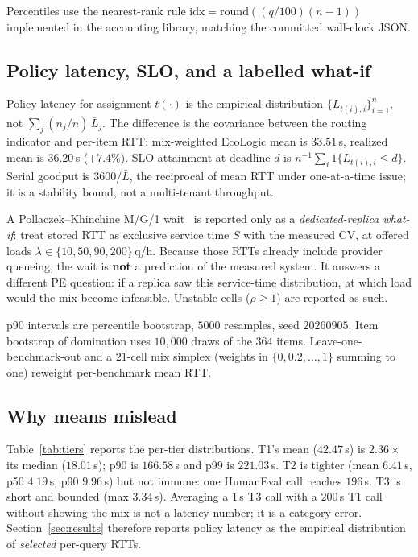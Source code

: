 \documentclass[10pt,conference]{IEEEtran}
\begin{document}
Percentiles use the nearest-rank rule $\mathrm{idx}=\mathrm{round}((q/100)(n-1))$ implemented in the accounting library, matching the committed wall-clock JSON.

\subsection{Policy latency, SLO, and a labelled what-if}
Policy latency for assignment $t(\cdot)$ is the empirical distribution $\{L_{t(i),i}\}_{i=1}^{n}$, not $\sum_j (n_j/n)\,\bar L_j$. The difference is the covariance between the routing indicator and per-item RTT: mix-weighted EcoLogic mean is $33.51$\,s, realized mean is $36.20$\,s ($+7.4\%$). SLO attainment at deadline $d$ is $n^{-1}\sum_i 1\{L_{t(i),i}\le d\}$. Serial goodput is $3600/\bar L$, the reciprocal of mean RTT under one-at-a-time issue; it is a stability bound, not a multi-tenant throughput.

A Pollaczek--Khinchine M/G/1 wait~\cite{kleinrock1975queueing,harchol2013performance} is reported only as a \emph{dedicated-replica what-if}: treat stored RTT as exclusive service time $S$ with the measured CV, at offered loads $\lambda\in\{10,50,90,200\}$\,q/h. Because those RTTs already include provider queueing, the wait is \textbf{not} a prediction of the measured system. It answers a different PE question: if a replica saw this service-time distribution, at which load would the mix become infeasible. Unstable cells ($\rho\ge 1$) are reported as such.

p90 intervals are percentile bootstrap, $5000$ resamples, seed $20260905$. Item bootstrap of domination uses $10{,}000$ draws of the $364$ items. Leave-one-benchmark-out and a $21$-cell mix simplex (weights in $\{0,0.2,\ldots,1\}$ summing to one) reweight per-benchmark mean RTT.

\subsection{Why means mislead}
Table~\ref{tab:tiers} reports the per-tier distributions. T1's mean ($42.47$\,s) is $2.36\times$ its median ($18.01$\,s); p90 is $166.58$\,s and p99 is $221.03$\,s. T2 is tighter (mean $6.41$\,s, p50 $4.19$\,s, p90 $9.96$\,s) but not immune: one HumanEval call reaches $196$\,s. T3 is short and bounded (max $3.34$\,s). Averaging a $1$\,s T3 call with a $200$\,s T1 call without showing the mix is not a latency number; it is a category error. Section~\ref{sec:results} therefore reports policy latency as the empirical distribution of \emph{selected} per-query RTTs.
\end{document}
